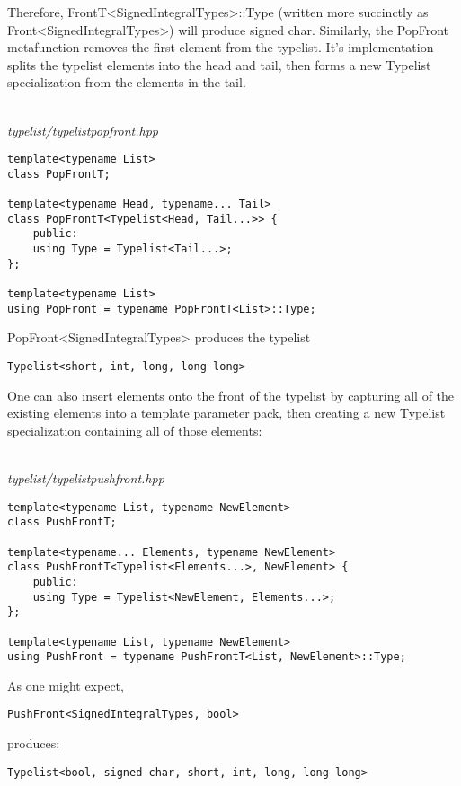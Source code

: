 Therefore, FrontT<SignedIntegralTypes>::Type (written more succinctly as Front<SignedIntegralTypes>) will produce signed char. Similarly, the PopFront metafunction removes the first element from the typelist. It’s implementation splits the typelist elements into the head and tail, then forms a new Typelist specialization from the elements in the tail.

\hspace*{\fill} \\ %
\noindent
\textit{typelist/typelistpopfront.hpp}
\begin{lstlisting}[style=styleCXX]
template<typename List>
class PopFrontT;

template<typename Head, typename... Tail>
class PopFrontT<Typelist<Head, Tail...>> {
	public:
	using Type = Typelist<Tail...>;
};

template<typename List>
using PopFront = typename PopFrontT<List>::Type;
\end{lstlisting}

PopFront<SignedIntegralTypes> produces the typelist

\begin{lstlisting}[style=styleCXX]
Typelist<short, int, long, long long>
\end{lstlisting}

One can also insert elements onto the front of the typelist by capturing all of the existing elements into a template parameter pack, then creating a new Typelist specialization containing all of those elements:

\hspace*{\fill} \\ %
\noindent
\textit{typelist/typelistpushfront.hpp}
\begin{lstlisting}[style=styleCXX]
template<typename List, typename NewElement>
class PushFrontT;

template<typename... Elements, typename NewElement>
class PushFrontT<Typelist<Elements...>, NewElement> {
	public:
	using Type = Typelist<NewElement, Elements...>;
};

template<typename List, typename NewElement>
using PushFront = typename PushFrontT<List, NewElement>::Type;
\end{lstlisting}

As one might expect,

\begin{lstlisting}[style=styleCXX]
PushFront<SignedIntegralTypes, bool>
\end{lstlisting}

produces:

\begin{lstlisting}[style=styleCXX]
Typelist<bool, signed char, short, int, long, long long>
\end{lstlisting}









